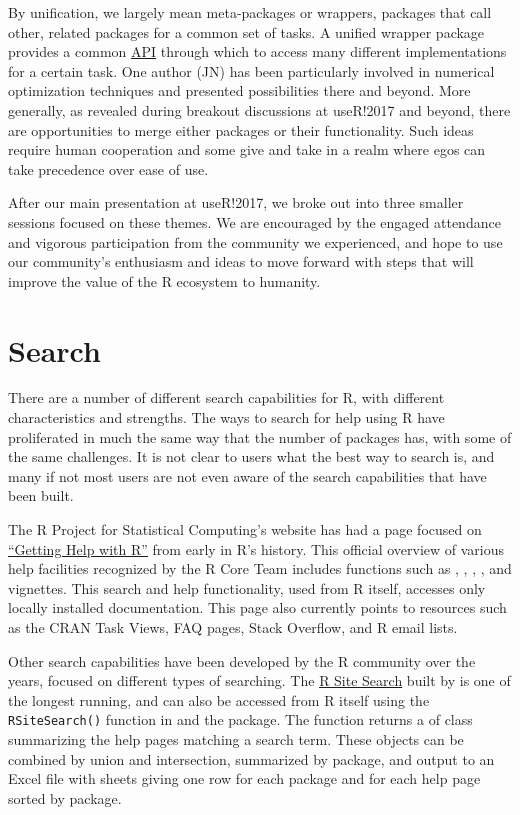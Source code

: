 By unification, we largely mean meta-packages or wrappers, packages that
call other, related packages for a common set of tasks. A unified
wrapper package provides a common
\href{https://en.wikipedia.org/wiki/Application_programming_interface}{API}
through which to access many different implementations for a certain
task. One author (JN) has been particularly involved in numerical
optimization techniques and presented possibilities there and beyond.
More generally, as revealed during breakout discussions at useR!2017 and
beyond, there are opportunities to merge either packages or their
functionality. Such ideas require human cooperation and some give and
take in a realm where egos can take precedence over ease of use.

After our main presentation at useR!2017, we broke out into three
smaller sessions focused on these themes. We are encouraged by the
engaged attendance and vigorous participation from the community we
experienced, and hope to use our community's enthusiasm and ideas to
move forward with steps that will improve the value of the R ecosystem
to humanity.

\hypertarget{search}{%
\section{Search}\label{search}}

There are a number of different search capabilities for R, with
different characteristics and strengths. The ways to search for help
using R have proliferated in much the same way that the number of
packages has, with some of the same challenges. It is not clear to users
what the best way to search is, and many if not most users are not even
aware of the search capabilities that have been built.

The R Project for Statistical Computing's website has had a page focused
on \href{https://www.r-project.org/help.html}{``Getting Help with R''}
\citep{gettinghelp} from early in R's history. This official overview of
various help facilities recognized by the R Core Team includes functions
such as , , ,
, and vignettes. This search and help functionality,
used from R itself, accesses only locally installed documentation. This
page also currently points to resources such as the CRAN Task Views, FAQ
pages, Stack Overflow, and R email lists.

Other search capabilities have been developed by the R community over
the years, focused on different types of searching. The
\href{http://search.r-project.org/nmz.html}{R Site Search} built by
\citet{baron} is one of the longest running, and can also be accessed
from R itself using the \texttt{RSiteSearch()} function in
 \citep{utils} and the  package. The
 function returns a  of class
 summarizing the help pages matching a search term. These
objects can be combined by union and intersection, summarized by
package, and output to an Excel file with sheets giving one row for each
package and for each help page sorted by package.

